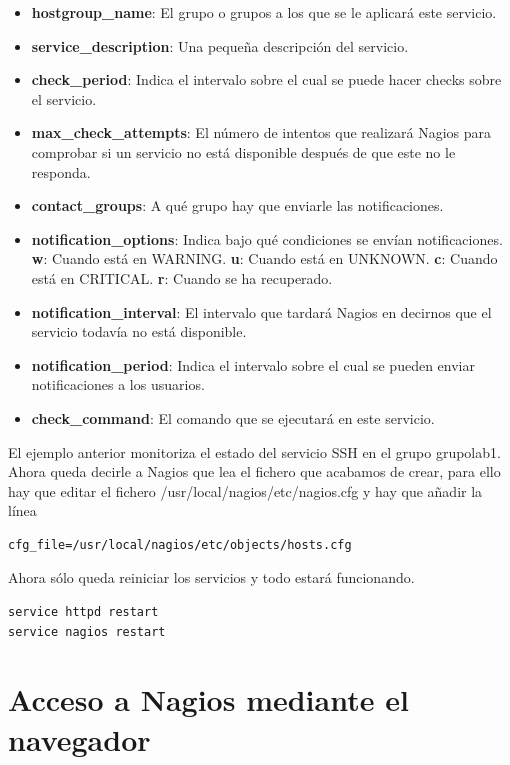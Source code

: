 \documentclass[11pt,a4paper]{article}
\begin{document}
\begin{itemize}
\item \textbf{hostgroup\_name}: El grupo o grupos a los que se le aplicará este servicio.
\item \textbf{service\_description}: Una pequeña descripción del servicio.
\item \textbf{check\_period}: Indica el intervalo sobre el cual se puede hacer checks sobre el servicio.
\item \textbf{max\_check\_attempts}: El número de intentos que realizará Nagios para comprobar si un servicio no está disponible después de que este no le responda.
\item \textbf{contact\_groups}: A qué grupo hay que enviarle las notificaciones.
\item \textbf{notification\_options}: Indica bajo qué condiciones se envían notificaciones. \textbf{w}: Cuando está en WARNING. \textbf{u}: Cuando está en UNKNOWN. \textbf{c}: Cuando está en CRITICAL. \textbf{r}: Cuando se ha recuperado.
\item \textbf{notification\_interval}: El intervalo que tardará Nagios en decirnos que el servicio todavía no está disponible.
\item \textbf{notification\_period}: Indica el intervalo sobre el cual se pueden enviar notificaciones a los usuarios.
\item \textbf{check\_command}: El comando que se ejecutará en este servicio.
\end{itemize}

El ejemplo anterior monitoriza el estado del servicio SSH en el grupo grupolab1.
\\

Ahora queda decirle a Nagios que lea el fichero que acabamos de crear, para ello hay que editar el fichero /usr/local/nagios/etc/nagios.cfg y hay que añadir la línea

\begin{verbatim}
cfg_file=/usr/local/nagios/etc/objects/hosts.cfg
\end{verbatim}

Ahora sólo queda reiniciar los servicios y todo estará funcionando.

\begin{verbatim}
service httpd restart
service nagios restart
\end{verbatim}

\newpage
\section{Acceso a Nagios mediante el navegador}
\end{document}
